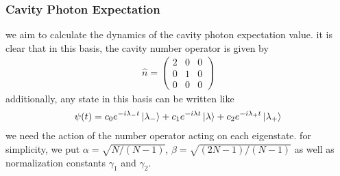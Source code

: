 \documentclass[10pt]{article}
\begin{document}
\subsubsection{Cavity Photon Expectation}
we aim to calculate the dynamics of the cavity photon expectation value. 
it is clear that in this basis, the cavity number operator is given by
\begin{gather}
    \hat{n} = 
    \begin{pmatrix} 2 & 0 & 0 \\ 0 & 1 & 0 \\ 0 & 0 & 0 \end{pmatrix} 
\end{gather}
additionally, any state in this basis can be written like
\begin{gather}
    \psi(t) = c_0 e^{-i\lambda_{-} t} \ket{\lambda_{-}} + c_1
    e^{-i\lambda t} \ket{\lambda} + c_2 e^{-i\lambda_{+} t} \ket{\lambda_{+}} 
\end{gather}
we need the action of the number operator acting on each eigenstate. 
for simplicity, we put $\alpha = \sqrt{N / (N-1)}$, $\beta = \sqrt{(2N-1) / (N-1)}$
as well as normalization constants $\gamma_1$ and $\gamma_2$. 
\end{document}
